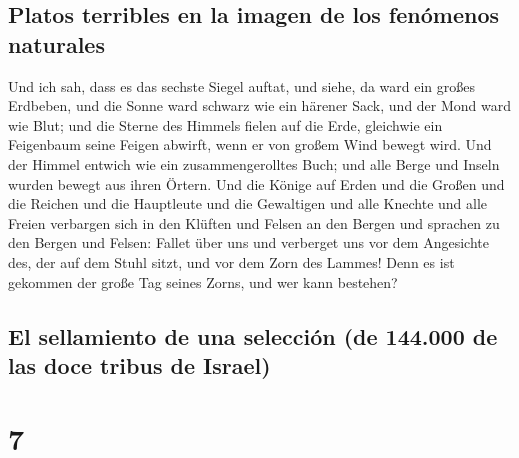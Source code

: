 \hypertarget{platos-terribles-en-la-imagen-de-los-fenuxf3menos-naturales}{%
\subsection{Platos terribles en la imagen de los fenómenos
naturales}\label{platos-terribles-en-la-imagen-de-los-fenuxf3menos-naturales}}

 Und ich sah, dass es das sechste Siegel auftat, und
siehe, da ward ein großes Erdbeben, und die Sonne ward schwarz wie ein
härener Sack, und der Mond ward wie Blut;  und die Sterne
des Himmels fielen auf die Erde, gleichwie ein Feigenbaum seine Feigen
abwirft, wenn er von großem Wind bewegt wird.  Und der
Himmel entwich wie ein zusammengerolltes Buch; und alle Berge und Inseln
wurden bewegt aus ihren Örtern.  Und die Könige auf Erden
und die Großen und die Reichen und die Hauptleute und die Gewaltigen und
alle Knechte und alle Freien verbargen sich in den Klüften und Felsen an
den Bergen  und sprachen zu den Bergen und Felsen: Fallet
über uns und verberget uns vor dem Angesichte des, der auf dem Stuhl
sitzt, und vor dem Zorn des Lammes!  Denn es ist gekommen
der große Tag seines Zorns, und wer kann bestehen?

\hypertarget{el-sellamiento-de-una-selecciuxf3n-de-144.000-de-las-doce-tribus-de-israel}{%
\subsection{El sellamiento de una selección (de 144.000 de las doce
tribus de
Israel)}\label{el-sellamiento-de-una-selecciuxf3n-de-144.000-de-las-doce-tribus-de-israel}}

\hypertarget{section-6}{%
\section{7}\label{section-6}}

